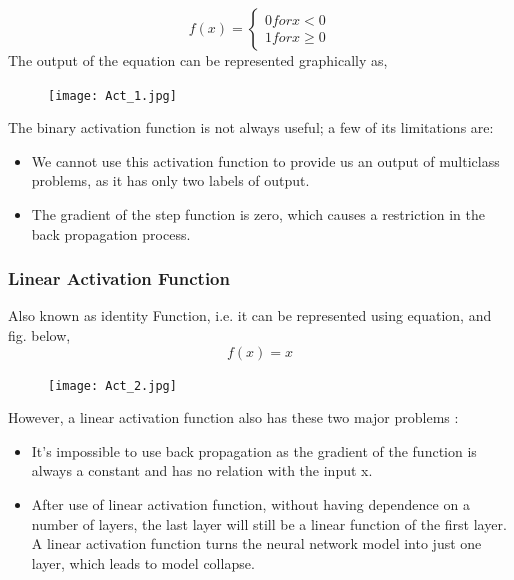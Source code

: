 \begin{equation} \label{eq:2}
   f(x) =  \begin{cases} 
      0 for x < 0 \\
      1 for x \geq 0 
   \end{cases}
\end{equation}
The output of the equation can be represented graphically as,
\begin{figure}[H]
    \centering
    \texttt{[image: Act\_1.jpg]}
    \label{fig:my_label}
\end{figure}
The binary activation function is not always useful; a few of its limitations are:
\begin{itemize}
    \item We cannot use this activation function to provide us an output of multiclass problems, as it has only two labels of output.
    \item The gradient of the step function is zero, which causes a restriction in the back propagation process.
\end{itemize}

 
\subsubsection{Linear Activation Function}
Also known as identity Function, i.e. it can be represented using equation, and fig. below,
\begin{equation}
    f(x) = x
\end{equation}

\begin{figure}[H]
    \centering
    \texttt{[image: Act\_2.jpg]}
    \label{fig:my_label_02wwe}
\end{figure}

However, a linear activation function also has these two major problems :

\begin{itemize}
    \item It’s impossible to use back propagation as the gradient of the function is always a constant and has no relation with the input x.
    \item After use of linear activation function, without having dependence on a number of layers, the last layer will still be a linear function of the first layer. A linear activation function turns the neural network model into just one layer, which leads to model collapse.
\end{itemize}

